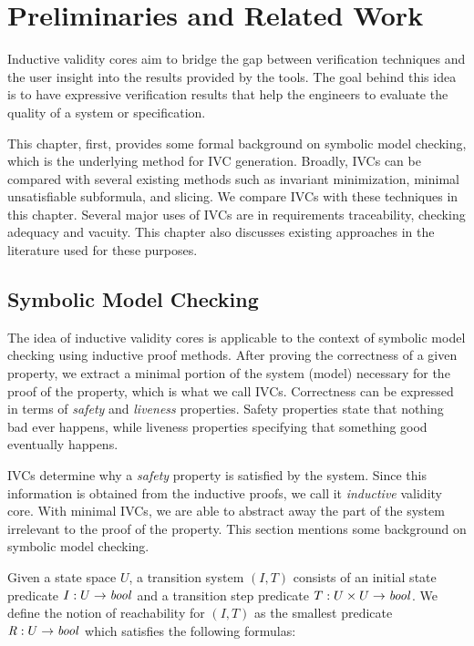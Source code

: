 \chapter{Preliminaries and Related Work}
\label{ch:background}
\label{sec:related}
Inductive validity cores aim to bridge the gap between verification techniques and the user insight into the results provided by the tools. The goal behind this idea is to have expressive verification results that help the engineers to evaluate the quality of a system or specification.

This chapter, first, provides some formal background on symbolic model checking, which is the underlying method for IVC generation. Broadly, IVCs can be compared with several existing methods such as invariant minimization, minimal unsatisfiable subformula, and slicing. We compare IVCs with these techniques in this chapter. Several major uses of IVCs are in requirements traceability, checking adequacy and vacuity. This chapter also discusses existing approaches in the literature used for these purposes.



\section{Symbolic Model Checking}

The idea of inductive validity cores is applicable to the context of symbolic model checking using inductive proof methods. After proving the correctness of a given property, we extract a minimal portion of the system (model) necessary for the proof of the property, which is what we call IVCs.
Correctness can be expressed in terms of \emph{safety} and \emph{liveness} properties. Safety properties state that nothing bad ever happens, while liveness properties specifying that something good eventually happens.

IVCs determine why a \emph{safety} property is satisfied by the system. Since this information is obtained from the inductive proofs, we call it \emph{inductive} validity core. With minimal IVCs, we are able to abstract away the part of the system irrelevant to the proof of the property. This section mentions some background on symbolic model checking.

Given a state space $U$, a transition system $(I,T)$ consists of an
initial state predicate $ I : U \to \mathit{bool} $ and a transition step
predicate $ T : U \times U \to \mathit{bool} $.
We define the notion of
reachability for $(I, T)$ as the smallest predicate $\mathit{R} : U \to
\mathit{bool}$ which satisfies the following formulas:

